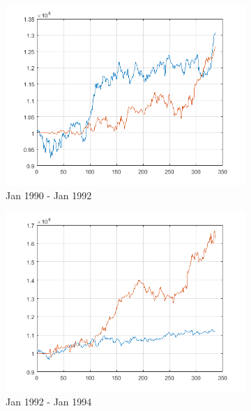 \documentclass[11pt,a4,twosided,singlespacing,titlepagenumber=on]{scrreprt}
\numberwithin{equation}{chapter} %
\theoremstyle{remark}
\begin{document}
\begin{figure}[H]
    \centering
    \begin{subfigure}[t]{0.32\textwidth}
        \centering
        \includegraphics[width=1\textwidth]{res/backtest/1}
        \caption{Jan 1990 - Jan 1992}
    \end{subfigure}
    \begin{subfigure}[t]{0.32\textwidth}
        \centering
        \includegraphics[width=1\textwidth]{res/backtest/2}
        \caption{Jan 1992 - Jan 1994}
    \end{subfigure}
    \begin{subfigure}[t]{0.32\textwidth}
        \centering

\end{subfigure}
\end{figure}
\end{document}
